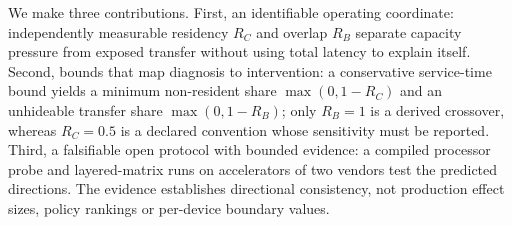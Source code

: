 We make three contributions. First, an identifiable operating coordinate:
independently measurable residency $R_C$ and overlap $R_B$ separate capacity
pressure from exposed transfer without using total latency to explain itself.
Second, bounds that map diagnosis to intervention: a conservative service-time
bound yields a minimum non-resident share $\max(0,1-R_C)$ and an unhideable
transfer share $\max(0,1-R_B)$; only $R_B=1$ is a derived crossover, whereas
$R_C=0.5$ is a declared convention whose sensitivity must be reported. Third, a
falsifiable open protocol with bounded evidence: a compiled processor probe and
layered-matrix runs on \NumAccel{} accelerators of two vendors test the
predicted directions. The evidence establishes directional consistency, not
production effect sizes, policy rankings or per-device boundary values.

\FloatBarrier
